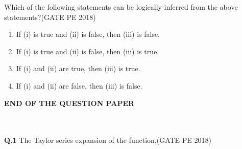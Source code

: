 \documentclass[journal,12pt,onecolumn]{IEEEtran}
\theoremstyle{remark}
\renewcommand{\headrulewidth}{1.4pt}
\begin{document}
\noindent
Which of the following statements can be logically inferred from the above statements?\hfill(GATE PE 2018)

\begin{enumerate}
\item If (i) is true and (ii) is false, then (iii) is false.
\item If (i) is true and (ii) is false, then (iii) is true.
\item If (i) and (ii) are true, then (iii) is true.
\item If (i) and (ii) are false, then (iii) is false.
\end{enumerate}

\vspace{5cm}

\begin{center}
	{\LARGE \textbf{END OF THE QUESTION PAPER}}
\end{center}

\clearpage
{}
\fancyfoot[R]{\thepage}

\renewcommand{\headrulewidth}{0.4pt}

\fancyfoot[R]{\thepage/\pageref{LastPage}}


\\\\
\noindent
\textbf{Q.1} The Taylor series expansion of the function,\hfill(GATE PE 2018)\\\\
\end{document}
